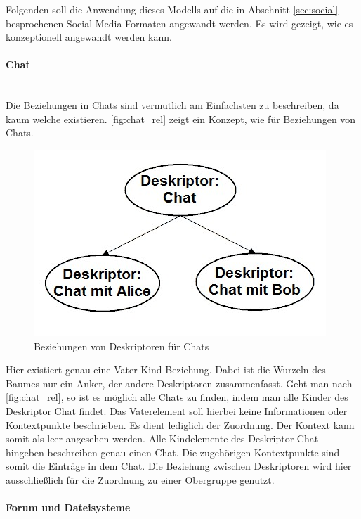 \documentclass[a4paper]{article}
\begin{document}
	Folgenden soll die Anwendung dieses Modells auf die in Abschnitt \ref{sec:social}
	besprochenen Social Media Formaten angewandt werden. Es wird gezeigt, wie es
	konzeptionell angewandt werden kann.
	
	\paragraph{Chat}\mbox{} \\
	
	Die Beziehungen in Chats sind vermutlich am Einfachsten zu beschreiben, da
	kaum welche existieren. \autoref{fig:chat_rel} zeigt ein Konzept, wie
	für Beziehungen von Chats.

	\begin{figure}[H]
		\includegraphics[width=\linewidth]{../Bilder/chat_rel.jpg}
		\caption{Beziehungen von Deskriptoren für Chats}
		\label{fig:chat_rel}
	\end{figure}
	
	Hier existiert genau eine Vater-Kind Beziehung. Dabei ist die
	Wurzeln des Baumes nur ein Anker, der andere Deskriptoren zusammenfasst.
	Geht man nach \autoref{fig:chat_rel}, so ist es möglich alle Chats
	zu finden, indem man alle Kinder des Deskriptor Chat findet. Das
	Vaterelement soll hierbei keine Informationen oder Kontextpunkte
	beschrieben. Es dient lediglich der Zuordnung. Der Kontext kann somit als
	leer angesehen werden. Alle Kindelemente des Deskriptor Chat hingeben
	beschreiben genau einen Chat. Die zugehörigen Kontextpunkte sind somit die
	Einträge in dem Chat. Die Beziehung zwischen Deskriptoren wird hier 
	ausschließlich für die Zuordnung zu einer Obergruppe genutzt. 
		
	\paragraph{Forum und Dateisysteme}\mbox{} \\
	
\end{document}

